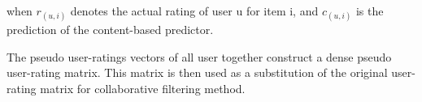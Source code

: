 \begin{displaymath}

\end{displaymath}

when \( r_(u,i) \) denotes the actual rating of user u for item i, and \(c_(u,i) \) is the prediction of the content-based predictor. 

The pseudo user-ratings vectors of all user together construct a dense pseudo user-rating matrix. This matrix is then used as a substitution of the original user-rating matrix for collaborative filtering method. 





